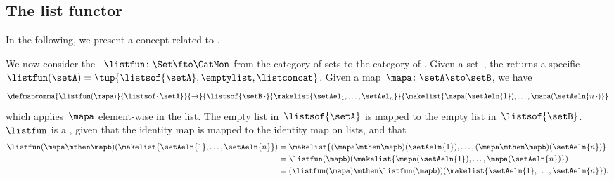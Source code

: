 \subsection{The list functor}
In the following, we present a concept related to .

We now consider the ~$\listfun\colon \Set \fto \CatMon$ from the category of sets to the category of .
Given a set~\setA, the  returns a specific  $\listfun(\setA)=\tup{\listsof{\setA},\emptylist, \listconcat}$.
Given a map~$\mapa\colon \setA \sto \setB$, we have
\begin{equation}
    \defmapcomma{
        \listfun(\mapa)
    }{
        \listsof{\setA}
    }{
        \to
    }{
        \listsof{\setB}
    }{
        \makelist{\setAel_1, \ldots, \setAel_n}
    }{
        \makelist{\mapa(\setAeln{1}), \ldots, \mapa(\setAeln{n})}
    }
\end{equation}
which applies~$\mapa$ element-wise in the list.
The empty list in~$\listsof{\setA}$ is mapped to the empty list in~$\listsof{\setB}$.
    {}
$\listfun$ is a , given that the identity map is mapped to the identity map on lists, and that
\begin{equation}
    \begin{aligned}
        \listfun(\mapa \mthen \mapb)(\makelist{\setAeln{1},\ldots,\setAeln{n}}) & =\makelist{(\mapa \mthen \mapb)(\setAeln{1}), \ldots, (\mapa \mthen \mapb)(\setAeln{n})} \\
                                                                                & =\listfun(\mapb)(\makelist{\mapa(\setAeln{1}), \ldots, \mapa(\setAeln{n})}) \\
                                                                                & =(\listfun(\mapa)\mthen \listfun(\mapb))(\makelist{\setAeln{1}, \ldots, \setAeln{n}}).
    \end{aligned}
\end{equation}


